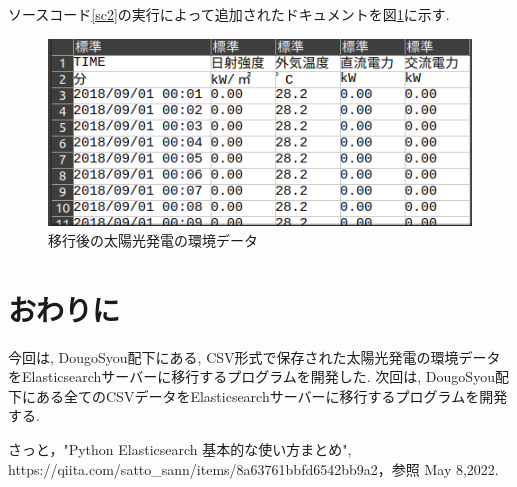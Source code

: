 \documentclass[a4j,12pt,]{jarticle}
\begin{document}
ソースコード\ref{sc2}の実行によって追加されたドキュメントを図\ref{p2}に示す.

\begin{figure}[H]
  \begin{center}
    \includegraphics[width=160mm]{csv.png}
    \caption{移行後の太陽光発電の環境データ}
    \label{p2}
  \end{center}
\end{figure}

\section{おわりに}
今回は, DougoSyou配下にある, CSV形式で保存された太陽光発電の環境データをElasticsearchサーバーに移行するプログラムを開発した.
次回は, DougoSyou配下にある全てのCSVデータをElasticsearchサーバーに移行するプログラムを開発する.

\begin{thebibliography}{5}
  さっと，"Python Elasticsearch 基本的な使い方まとめ",\\ https://qiita.com/satto\_sann/items/8a63761bbfd6542bb9a2，参照 May 8,2022.
\end{thebibliography}
\end{document}
